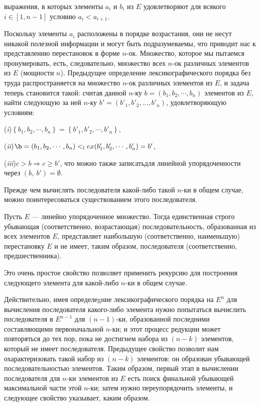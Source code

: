{\noindent выражения, в которых элементы $a_i$ и $b_i$ из $E$ удовлетворяют для всякого
 $i \in [1, n - 1]$ условию $a_i < a_{i+1}$.

Поскольку элементы $a_i$ расположены в порядке возрастания, они не
несут никакой полезной информации и могут быть подразумеваемы,
что приводит нас к представлению перестановок в форме $n$-ок.
Множество, которое мы пытаемся пронумеровать, есть, следовательно,
множество всех $n$-ок различных элементов из $E$ (мощности $n$). Предыдущее
определение лексикографического порядка без труда распространяется
на множество $n$-ок различных элементов из $E$, и задача теперь становится
такой: считая данной $n$-ку $b = (b_1,b_2, \cdots ,b_n)$ элементов из $E$, найти следующую
за ней $n$-ку $b' = (b'_1, b'_2,..., b'_n)$, удовлетворяющую условиям:\newline

(\textit{i})$\left\{ b_1,b_2,\cdots, b_n \right\} =\left\{ b'_1,b'_2, \cdots, b'_n\right\}$,

(\textit{ii})$\b = (b_1, b_2, \cdots, b_n) <_lex (b'_1, b'_2, \cdots, b'_n) = b'$,

(\textit{iii})$c > b \Rightarrow c \geq b'$, что можно также записатьдля линейной
упорядоченности через $(b,\: b') = \emptyset$.\newline

Прежде чем вычислять последователя какой-либо такой $n$-ки
 в общем случае, можно поинтересоваться существованием этого последователя.

\begin{property}
\hspace*{15pt}Пусть $E$ — линейно упорядоченное множество. Тогда единственная строго убывающая
(соответственно, возрастающая) последовательность, образованная из всех элементов $E$,
представляет наибольшую (соответственно, наименьшую) перестановку $E$ и не имеет,
таким образом, последователя (соответственно, предшественника).
\end{property}

Это очень простое свойство позволяет применить рекурсию для построения следующего
элемента для какой-либо $n$-ки в общем случае.
\newpage

\noindent Действительно, имея определеgние лексикографического порядка на $E^n$ 
для вычисления последователя какого-либо элемента нужно попытаться 
вычислить последователя в $E^{n-1}$ для $(n - 1)$-ки, образованной  
последними составляющими первоначальной $n$-ки; и этот процесс редукции 
может повторяться до тех пор, пока не достигнем набора из $(n - k)$ 
элементов, который не имеет последователя. Предыдущее свойство  
позволит нам охарактеризовать такой набор из $(n - k)$ элементов: он  
образован убывающей последовательностью элементов. Таким образом,  
первый этап в вычислении последователя для $n$-ки элементов из $E$ есть  
поиск финальной убывающей максимальной части этой $n$-ки; затем  
нужно переупорядочить элементы, и следующее свойство указывает, каким 
образом.

}
